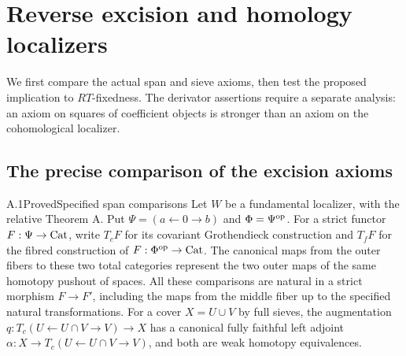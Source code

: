 \section{Reverse excision and homology localizers}
\label{sec:A}
We first compare the actual span and sieve axioms, then test the proposed implication to $RT$-fixedness. The derivator assertions require a separate analysis: an axiom on squares of coefficient objects is stronger than an axiom on the cohomological localizer.

\subsection{The precise comparison of the excision axioms}

\begin{claim}{A.1}{Proved}{Specified span comparisons}\label{A1}
Let $W$ be a fundamental localizer, with the relative Theorem A. Put $\Psi=(a\leftarrow0\to b)$ and $\Phi=\Psi^{\mathrm{op}}$. For a strict functor $F:\Psi\to\mathrm{Cat}$, write $T_cF$ for its covariant Grothendieck construction and $T_fF$ for the fibred construction of $F:\Phi^{\mathrm{op}}\to\mathrm{Cat}$. The canonical maps from the outer fibers to these two total categories represent the two outer maps of the same homotopy pushout of spaces. All these comparisons are natural in a strict morphism $F\to F'$, including the maps from the middle fiber up to the specified natural transformations. For a cover $X=U\cup V$ by full sieves, the augmentation $q:T_c(U\leftarrow U\cap V\to V)\to X$ has a canonical fully faithful left adjoint $\alpha:X\to T_c(U\leftarrow U\cap V\to V)$, and both are weak homotopy equivalences.
\end{claim}
